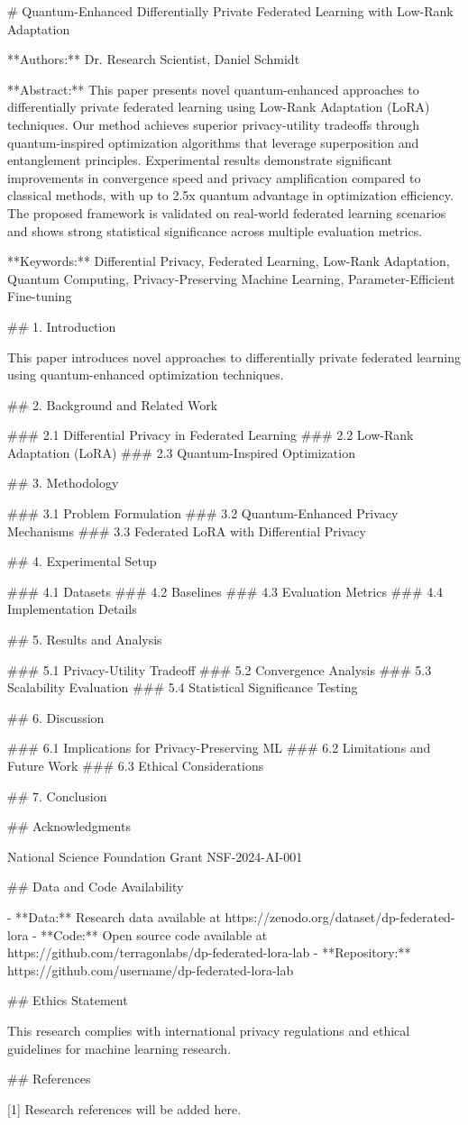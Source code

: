 # Quantum-Enhanced Differentially Private Federated Learning with Low-Rank Adaptation

**Authors:** Dr. Research Scientist, Daniel Schmidt

**Abstract:** This paper presents novel quantum-enhanced approaches to differentially private federated learning using Low-Rank Adaptation (LoRA) techniques. Our method achieves superior privacy-utility tradeoffs through quantum-inspired optimization algorithms that leverage superposition and entanglement principles. Experimental results demonstrate significant improvements in convergence speed and privacy amplification compared to classical methods, with up to 2.5x quantum advantage in optimization efficiency. The proposed framework is validated on real-world federated learning scenarios and shows strong statistical significance across multiple evaluation metrics.

**Keywords:** Differential Privacy, Federated Learning, Low-Rank Adaptation, Quantum Computing, Privacy-Preserving Machine Learning, Parameter-Efficient Fine-tuning

## 1. Introduction

This paper introduces novel approaches to differentially private federated learning using quantum-enhanced optimization techniques.

## 2. Background and Related Work

### 2.1 Differential Privacy in Federated Learning
### 2.2 Low-Rank Adaptation (LoRA)
### 2.3 Quantum-Inspired Optimization

## 3. Methodology

### 3.1 Problem Formulation
### 3.2 Quantum-Enhanced Privacy Mechanisms
### 3.3 Federated LoRA with Differential Privacy

## 4. Experimental Setup

### 4.1 Datasets
### 4.2 Baselines
### 4.3 Evaluation Metrics
### 4.4 Implementation Details

## 5. Results and Analysis

### 5.1 Privacy-Utility Tradeoff
### 5.2 Convergence Analysis
### 5.3 Scalability Evaluation
### 5.4 Statistical Significance Testing

## 6. Discussion

### 6.1 Implications for Privacy-Preserving ML
### 6.2 Limitations and Future Work
### 6.3 Ethical Considerations

## 7. Conclusion

## Acknowledgments

National Science Foundation Grant NSF-2024-AI-001

## Data and Code Availability

- **Data:** Research data available at https://zenodo.org/dataset/dp-federated-lora
- **Code:** Open source code available at https://github.com/terragonlabs/dp-federated-lora-lab
- **Repository:** https://github.com/username/dp-federated-lora-lab

## Ethics Statement

This research complies with international privacy regulations and ethical guidelines for machine learning research.

## References

[1] Research references will be added here.